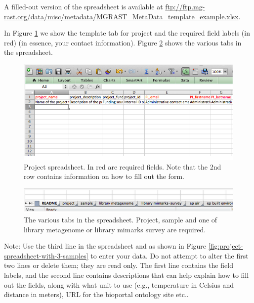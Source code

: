\documentclass[12pt,fullpage]{report}
\begin{document}
A filled-out version of the spreadsheet is available at \url{ftp://ftp.mg-rast.org/data/misc/metadata/MGRAST_MetaData_template_example.xlsx}.

In Figure \ref{fig:project-spreadsheet} we show the template tab for project and the required field labels (in red) (in essence, your contact information).
Figure \ref{fig:project-spreadsheet-multiple-tabs} shows the various tabs in the spreadsheet.

\begin{figure}[ht]
\begin{center}
\includegraphics[width=6in]{Images/project-spreadsheet.png}
\end{center}
\caption{
Project spreadsheet. In red are required fields. Note that the 2nd row contains information on how to fill out the form.
}
\label{fig:project-spreadsheet}
\end{figure}

\begin{figure}[ht]
\begin{center}
\includegraphics[width=6in]{Images/project-spreadsheet-multiple-tabs.png}
\end{center}
\caption{
The various tabs in the spreadsheet. Project, sample and one of library metagenome or library mimarks survey are required.
}
\label{fig:project-spreadsheet-multiple-tabs}
\end{figure}

Note: Use the third line in the spreadsheet and as shown in Figure \ref{fig:project-spreadsheet-with-3-samples} to enter your data. Do not attempt to alter the first two lines or delete them; they are read only. The first line contains the field labels, and the second line contains descriptions that can help explain how to fill out the fields, along with what unit to use (e.g., temperature in Celsius and distance in meters), URL for the bioportal ontology site etc..
\end{document}
